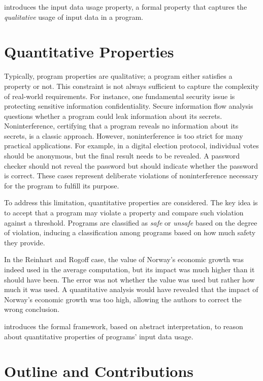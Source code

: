  introduces the input data usage property, a formal property that captures the \emph{qualitative} usage of input data in a program.

\section{Quantitative Properties}

Typically, program properties are qualitative; a program either satisfies a property or not.
This constraint is not always sufficient to capture the complexity of real-world requirements.
For instance, one fundamental security issue is protecting sensitive information confidentiality.
Secure information flow analysis questions whether a program could leak information about its secrets.
Noninterference, certifying that a program reveals no information about its secrets, is a classic approach.
However, noninterference is too strict for many practical applications.
For example, in a digital election protocol, individual votes should be anonymous, but the final result needs to be revealed.
A password checker should not reveal the password but should indicate whether the password is correct.
These cases represent deliberate violations of noninterference necessary for the program to fulfill its purpose.

To address this limitation, quantitative properties are considered.
The key idea is to accept that a program may violate a property and compare such violation against a threshold.
Programs are classified as \emph{safe} or \emph{unsafe} based on the degree of violation, inducing a classification among programs based on how much safety they provide.

In the Reinhart and Rogoff case, the value of Norway's economic growth was indeed used in the average computation, but its impact was much higher than it should have been.
The error was not whether the value was used but rather how much it was used.
A quantitative analysis would have revealed that the impact of Norway's economic growth was too high, allowing the authors to correct the wrong conclusion.

 introduces the formal framework, based on abstract interpretation, to reason about quantitative properties of programs' input data usage.

\section{Outline and Contributions}

